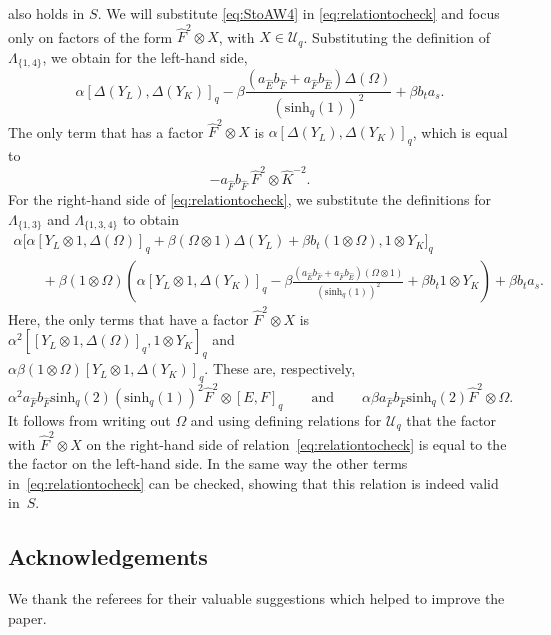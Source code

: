 \documentclass[10pt,a4paper]{amsart}
\numberwithin{equation}{section}
\newcommand{\shq}{\mathrm{sinh}_q}
\newcommand{\Uq}{\mathcal{U}_q}
\begin{document}
also holds in $S$. We will substitute \eqref{eq:StoAW4} in \eqref{eq:relationtocheck} and focus only on factors of the form $\hat{F}^2\otimes X$, with $X\in \Uq$. Substituting the definition of $\Lambda_{\{1,4\}}$, we obtain for the left-hand side,
\[
\alpha[\Delta(Y_L),\Delta(Y_K)]_q - \beta \frac{(a_{\hat{E}}b_{\hat{F}}+a_{\hat{F}}b_{\hat{E}})\Delta(\Omega)}{(\shq(1))^2} +\beta b_ta_s.
\]
The only term that has a factor $\hat{F}^2\otimes X$ is $\alpha[\Delta(Y_L),\Delta(Y_K)]_q$, which is equal to
\[
-a_{\hat{F}}b_{\hat{F}}\ 	\hat{F}^2\otimes \hat{K}^{-2}.
\]
For the right-hand side of \eqref{eq:relationtocheck}, we substitute the definitions for $\Lambda_{\{1,3\}}$ and $\Lambda_{\{1,3,4\}}$ to obtain
\begin{gather*}
	\alpha \big[\alpha[Y_L\otimes 1,\Delta(\Omega)]_q + \beta (\Omega\otimes 1)\Delta(Y_L)+\beta b_t(1\otimes \Omega),1\otimes Y_K \big]_q \\
	\qquad+\beta (1\otimes\Omega)\left(\alpha[Y_L\otimes 1,\Delta(Y_K)]_q - \beta \frac{(a_{\hat E}b_{\hat F}+ a_{\hat F}b_{\hat E})(\Omega\otimes1)}{(\shq(1))^2}+\beta b_t1\otimes Y_K\right)+ \beta b_ta_s.
\end{gather*}
Here, the only terms that have a factor $\hat{F}^2\otimes X$ is $\alpha^2 [[Y_L\otimes 1,\Delta(\Omega)]_q,1\otimes Y_K]_q$ and\\ $\alpha \beta (1\otimes\Omega)[Y_L\otimes 1,\Delta(Y_K)]_q$. These are, respectively,
\[
\alpha^2 a_{\hat{F}}b_{\hat{F}} \shq(2) (\shq(1))^2 \hat{F}^2\otimes [E,F]_q \qquad \text{and} \qquad \alpha \beta a_{\hat{F}}b_{\hat{F}} \shq(2) \hat{F}^2\otimes \Omega.
\]
It follows from writing out $\Omega$ and using defining relations for $\Uq$ that the factor with $\hat F^2 \otimes X$ on the right-hand side of relation~\eqref{eq:relationtocheck} is equal to the the factor on the left-hand side. In the same way the other terms in~\eqref{eq:relationtocheck} can be checked, showing that this relation is indeed valid in~$S$.

\subsection*{Acknowledgements}
We thank the referees for their valuable suggestions which helped to improve the paper.

\end{document}
